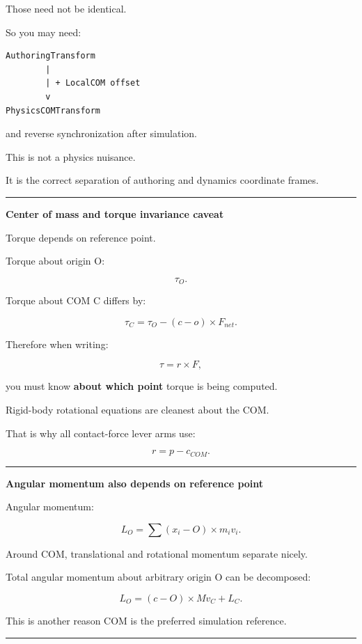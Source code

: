 Those need not be identical.

So you may need:

\begin{verbatim}
AuthoringTransform
        |
        | + LocalCOM offset
        v
PhysicsCOMTransform
\end{verbatim}

and reverse synchronization after simulation.

This is not a physics nuisance.

It is the correct separation of authoring and dynamics coordinate frames.

\begin{center}\rule{0.5\linewidth}{0.5pt}\end{center}

\textbf{Center of mass and torque invariance caveat}

Torque depends on reference point.

Torque about origin O:

\[
\tau_O.
\]

Torque about COM C differs by:

\[
\tau_C
=
\tau_O-
(c-o)\times F_{net}.
\]

Therefore when writing:

\[
\tau=r\times F,
\]

you must know \textbf{about which point} torque is being computed.

Rigid-body rotational equations are cleanest about the COM.

That is why all contact-force lever arms use:

\[
r=p-c_{COM}.
\]

\begin{center}\rule{0.5\linewidth}{0.5pt}\end{center}

\textbf{Angular momentum also depends on reference point}

Angular momentum:

\[
L_O
=
\sum
(x_i-O)
\times
m_iv_i.
\]

Around COM, translational and rotational momentum separate nicely.

Total angular momentum about arbitrary origin O can be decomposed:

\[
\boxed{
L_O
=
(c-O)\times Mv_C
+
L_C.
}
\]

This is another reason COM is the preferred simulation reference.

\begin{center}\rule{0.5\linewidth}{0.5pt}\end{center}


